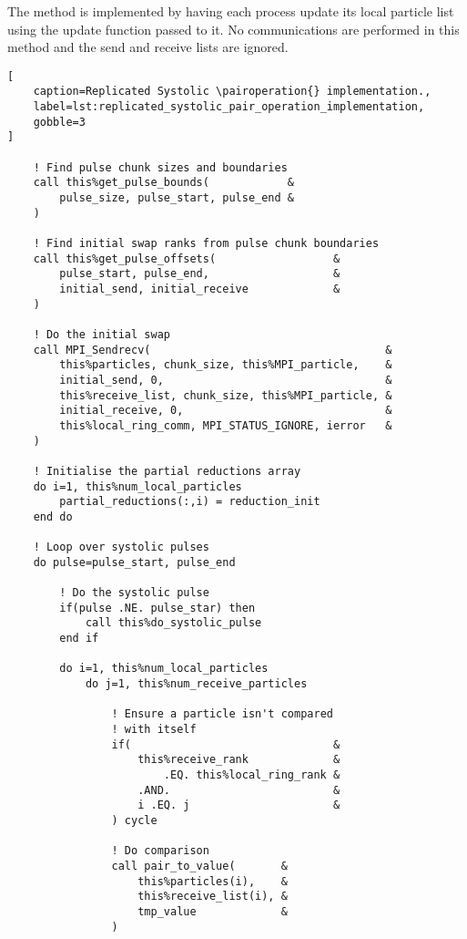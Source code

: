 The \individualoperation{} method is implemented by having each process update
its local particle list using the update function passed to it.
%
No communications are performed in this method and the send and receive
lists are ignored.

\begin{lstlisting}[
    caption=Replicated Systolic \pairoperation{} implementation.,
    label=lst:replicated_systolic_pair_operation_implementation,
    gobble=3
]

    ! Find pulse chunk sizes and boundaries
    call this%get_pulse_bounds(            &
        pulse_size, pulse_start, pulse_end &
    )

    ! Find initial swap ranks from pulse chunk boundaries
    call this%get_pulse_offsets(                  &
        pulse_start, pulse_end,                   &
        initial_send, initial_receive             &
    )

    ! Do the initial swap
    call MPI_Sendrecv(                                    &
        this%particles, chunk_size, this%MPI_particle,    &
        initial_send, 0,                                  &
        this%receive_list, chunk_size, this%MPI_particle, &
        initial_receive, 0,                               &
        this%local_ring_comm, MPI_STATUS_IGNORE, ierror   &
    )

    ! Initialise the partial reductions array
    do i=1, this%num_local_particles
        partial_reductions(:,i) = reduction_init
    end do

    ! Loop over systolic pulses
    do pulse=pulse_start, pulse_end

        ! Do the systolic pulse
        if(pulse .NE. pulse_star) then
            call this%do_systolic_pulse
        end if

        do i=1, this%num_local_particles
            do j=1, this%num_receive_particles

                ! Ensure a particle isn't compared
                ! with itself
                if(                               &
                    this%receive_rank             &
                        .EQ. this%local_ring_rank &
                    .AND.                         &
                    i .EQ. j                      &
                ) cycle

                ! Do comparison
                call pair_to_value(       &
                    this%particles(i),    &
                    this%receive_list(i), &
                    tmp_value             &
                )


\end{lstlisting}
